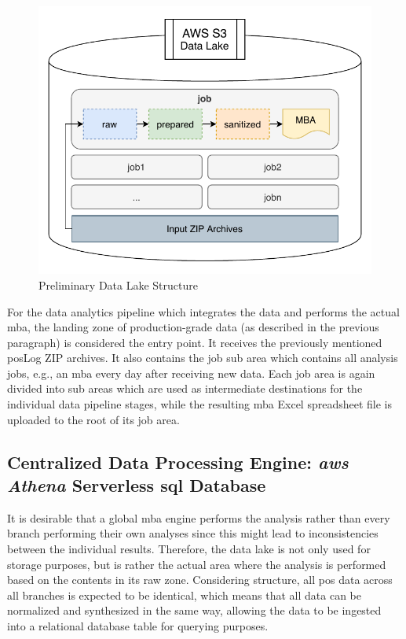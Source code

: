 \newpage

\begin{figure}[h!]
	\centering
	\includegraphics[width=0.67\linewidth]{main-matter/img/3-data-lake.pdf}
	\caption{Preliminary Data Lake Structure}
	\label{fig:3-data-lake}
\end{figure}

For the data analytics pipeline which integrates the data and performs the actual \ac{mba}, the landing zone of production-grade data (as described in the previous paragraph) is considered the entry point. It receives the previously mentioned \ac{pos}Log ZIP archives. It also contains the job sub area which contains all analysis jobs, e.g., an \ac{mba} every day after receiving new data. Each job area is again divided into sub areas which are used as intermediate destinations for the individual data pipeline stages, while the resulting \ac{mba} Excel spreadsheet file is uploaded to the root of its job area.

\subsection{Centralized Data Processing Engine: \textit{\acs{aws} Athena} Serverless \acs{sql} Database}

It is desirable that a global \ac{mba} engine performs the analysis rather than every branch performing their own analyses since this might lead to inconsistencies between the individual results. Therefore, the data lake is not only used for storage purposes, but is rather the actual area where the analysis is performed based on the contents in its raw zone. Considering structure, all \ac{pos} data across all branches is expected to be identical, which means that all data can be normalized and synthesized in the same way, allowing the data to be ingested into a relational database table for querying purposes.

